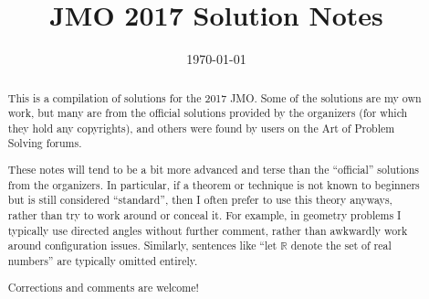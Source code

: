 \documentclass[11pt]{scrartcl}
\title{JMO 2017 Solution Notes}
\date{\today}
\begin{document}
\maketitle

\begin{abstract}
This is a compilation of solutions
for the 2017 JMO.
Some of the solutions are my own work,
but many are from the official solutions provided by the organizers
(for which they hold any copyrights),
and others were found by users on the Art of Problem Solving forums.

These notes will tend to be a bit more advanced and terse than the ``official''
solutions from the organizers.
In particular, if a theorem or technique is not known to beginners
but is still considered ``standard'', then I often prefer to
use this theory anyways, rather than try to work around or conceal it.
For example, in geometry problems I typically use directed angles
without further comment, rather than awkwardly work around configuration issues.
Similarly, sentences like ``let $\mathbb{R}$ denote the set of real numbers''
are typically omitted entirely.

Corrections and comments are welcome!
\end{abstract}

\tableofcontents
\newpage

\addtocounter{section}{-1}
\end{document}
